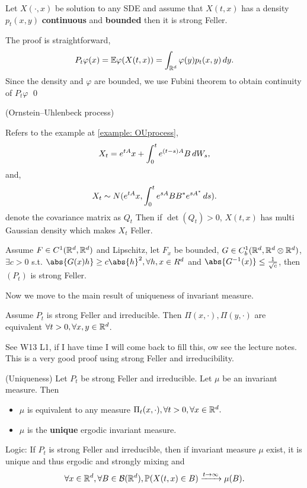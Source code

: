 \begin{thm}
Let $X(\cdot, x)$ be solution to any SDE and assume that $X(t,x)$ has a density $p_t(x,y)$ \textbf{continuous} and \textbf{bounded} then it is strong Feller.
\end{thm}

\pf The proof is straightforward,
\begin{equation*}
    P_t\varphi(x) = \mathbb{E}\varphi(X(t,x)) = \int_{\mathbb{R}^d} \varphi(y) p_t(x,y) \mathop{}\!d y.
\end{equation*}
Since the density and $\varphi$ are bounded, we use Fubini theorem to obtain continuity of $P_t\varphi$ 
\qed

\begin{example}{(Ornstein–Uhlenbeck process)}

Refers to the example at \ref{example: OUprocess}, 
\begin{equation*}
    X_t = e^{tA}x + \int_0^t e^{(t-s)A}B \mathop{}\!d W_s,
\end{equation*}
and,
\begin{equation*}
    X_t \sim N(e^{tA}x, \int_0^t e^{sA} BB^* e^{sA^*} \mathop{}\!d s).
\end{equation*} denote the covariance matrix as $Q_t$
Then if $\det(Q_t)>0$, $X(t,x)$ has multi Gaussian density which makes $X_t$ Feller.
\end{example}


\begin{thm}
Assume $F\in C^1(\mathbb{R}^d, \mathbb{R}^d)$ and Lipschitz, let $F_x$ be bounded, $G\in C_b^1(\mathbb{R}^d, \mathbb{R}^d \otimes \mathbb{R}^d)$, $\exists c >0$ s.t. $\abs{G(x) h} \geq c\abs{h}^2, \forall h,x\in R^d$ and $\abs{G^{-1}(x)} \leq \frac{1}{\sqrt{c}}$, then $(P_t)$ is strong Feller.
\end{thm}
\vspace{1cm}
Now we move to the main result of uniqueness of invariant measure.
\begin{thm}
Assume $P_t$ is strong Feller and irreducible. Then $\Pi(x, \cdot), \Pi(y, \cdot)$ are equivalent $\forall t>0, \forall x,y\in\mathbb{R}^d$.
\end{thm}
\pf See W13 L1, if I have time I will come back to fill this, ow see the lecture notes. This is a very good proof using strong Feller and irreducibility.

\begin{thm}{(Uniqueness)}
Let $P_t$ be strong Feller and irreducible. Let $\mu$ be an invariant measure. Then 
\begin{itemize}
    \item $\mu$ is equivalent to any measure $\Pi_t(x,\cdot), \forall t>0, \forall x\in\mathbb{R}^d.$
    \item $\mu$ is the \textbf{unique} ergodic invariant measure.
\end{itemize}
\end{thm}
Logic: If $P_t$ is strong Feller and irreducible, then if invariant measure $\mu$ exist, it is unique and thus ergodic and strongly mixing and 
\begin{equation*}
    \forall x \in \mathbb{R}^d, \forall B\in\mathcal{B}(\mathbb{R}^d), \mathbb{P}(X(t,x)\in B) \xrightarrow{t\rightarrow\infty} \mu(B).
\end{equation*}

